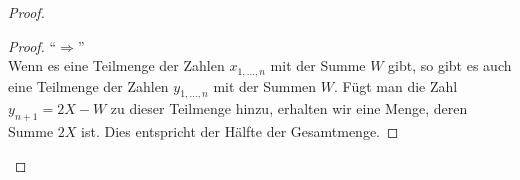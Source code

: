 \documentclass[a4paper]{scrartcl}
\begin{document}
\begin{enumerate}[label=\bfseries \arabic*.]
\begin{enumerate}
\begin{proof}
\begin{enumerate}
\begin{proof}
                    ``$\Rightarrow$'' \\
                    Wenn es eine Teilmenge der Zahlen $x_{1,\dotsc,n}$ mit der Summe $W$ gibt, so gibt es auch eine Teilmenge der Zahlen $y_{1,\dotsc,n}$
                    mit der Summen $W$.
                    Fügt man die Zahl $y_{n+1} = 2X - W$ zu dieser Teilmenge hinzu, erhalten wir eine Menge, deren Summe $2X$ ist.
                    Dies entspricht der Hälfte der Gesamtmenge.


                \end{proof}

        \end{enumerate}
    \end{proof}
\end{enumerate}

\end{enumerate}
\end{document}
